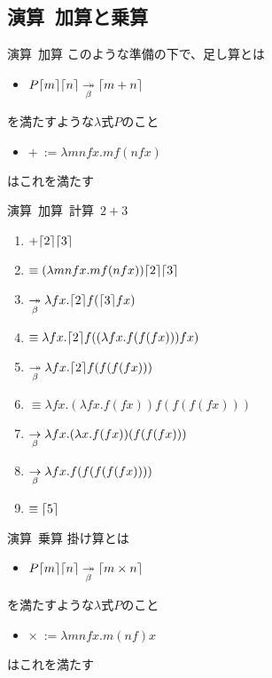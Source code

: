 \documentclass[pdflatex,17pt]{beamer}
\begin{document}
\subsection{演算~加算と乗算}
\subsectionpage
\begin{frame}{演算~加算}
    このような準備の下で、足し算とは
    \begin{itemize}
        \item $P\lceil m \rceil\lceil n \rceil \underset{\beta}{\twoheadrightarrow} \lceil m+n \rceil$
    \end{itemize}
    を満たすような$\lambda$式$P$のこと
    \pause
    \vspace{1em}
    \begin{itemize}
        \item $+~:= \lambda m n f x. m f (n f x)$
    \end{itemize}
    はこれを満たす
\end{frame}

\begin{frame}{演算~加算~計算~$2+3$}
    \begin{enumerate}
        \item \small $+\lceil 2 \rceil\lceil 3 \rceil$
        \pause
        \item \small $\equiv (\lambda m n f x. m f (n f x))\lceil 2 \rceil\lceil 3 \rceil$
        \pause
        \item \small $\underset{\beta}{\twoheadrightarrow} \lambda f x. \lceil 2 \rceil f (\lceil 3 \rceil f x)$
        \pause
        \item \small $\equiv \lambda f x. \lceil 2 \rceil f ((\lambda f x. f (f (f x))) f x)$
        \pause
        \item \small $\underset{\beta}{\twoheadrightarrow} \lambda f x. \lceil 2 \rceil f (f (f (f x)))$
        \pause
        \item \small $\equiv \lambda f x. (\lambda f x. f (f x)) f (f (f (f x)))$
        \pause
        \item \small $\underset{\beta}{\to} \lambda f x. (\lambda x. f (f x)) (f (f (f x)))$
        \pause
        \item \small $\underset{\beta}{\to} \lambda f x. f (f (f (f (f x))))$
        \pause
        \item \small $\equiv \lceil 5 \rceil$
    \end{enumerate}
\end{frame}

\begin{frame}{演算~乗算}
    掛け算とは
    \begin{itemize}
        \item $P\lceil m \rceil\lceil n \rceil \underset{\beta}{\twoheadrightarrow} \lceil m\times n \rceil$
    \end{itemize}
    を満たすような$\lambda$式$P$のこと
    \pause
    \vspace{1em}
    \begin{itemize}
        \item $\times~:= \lambda m n f x. m (n f) x$
    \end{itemize}
    はこれを満たす
\end{frame}
\end{document}
